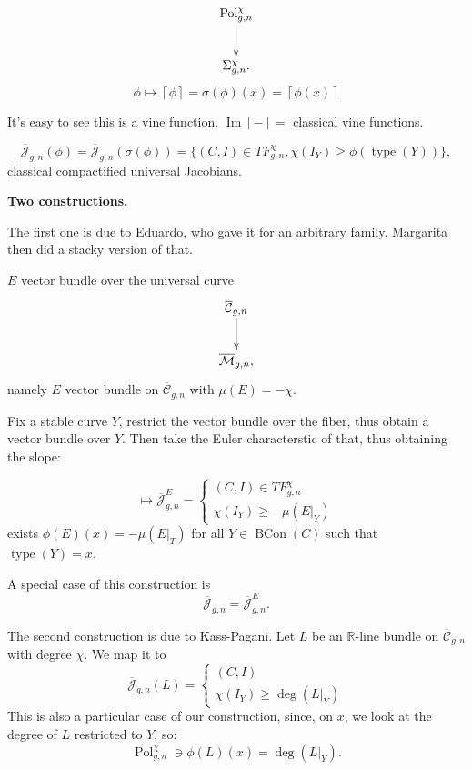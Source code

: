 $$
\xymatrix{
\operatorname{Pol}_{g,n}^{\chi}
\ar[d]\\
\Sigma_{g,n}^{\chi}.
}
$$
$$
\phi\mapsto \left\lceil \phi \right\rceil 
=
\sigma(\phi)(x)=
\left\lceil \phi(x) \right\rceil 
$$

It's easy to see this is a vine function.
$\operatorname{Im}\left\lceil - \right\rceil=$
classical vine functions.

\medskip\noindent
$$
\overline{\mathcal{J}}_{g,n}(\phi)
=
\overline{\mathcal{J}}_{g,n}(\sigma(\phi))
=\{(C,I) \in TF_{g,n}^{\chi},
\chi(I_Y) \geq 
\phi(\operatorname{type}(Y))\},
$$
classical compactified universal Jacobians.

\medskip\noindent
{\bf Two constructions.}

The first one is due to Eduardo, who gave
it for an arbitrary family. Margarita then
did a stacky version of that.

\begin{theorem}
\label{theorem-esteves-melo}
$E$ vector bundle over the universal curve
$$
\xymatrix{
\overline{\mathcal{C}}_{g,n}\ar[d]\\
\overline{\mathcal{M}}_{g,n},
}
$$
namely $E$ vector bundle on
$\overline{\mathcal{C}}_{g,n}$
with $\mu(E)=-\chi$.
\end{theorem}

\noindent
Fix a stable curve $Y$, restrict the vector bundle
over the fiber,  thus obtain a vector bundle
over $Y$. Then take the Euler characterstic
of that, thus obtaining the slope:

$$
\mapsto  \overline{ \mathcal{J}}_{g,n}^E
=
\begin{cases}
(C,I)\in TF_{g,n}^{\chi} \\
\chi(I_Y) \geq  -\mu(E|_Y)
\end{cases}
$$
exists $\phi(E)(x) = -\mu(E|_T)$
for all $Y \in \operatorname{BCon}(C)$
such that $\operatorname{type}(Y)=x$.

A special case of this construction is
$$
\overline{\mathcal{J}}_{g,n}
=
\overline{\mathcal{J}}_{g,n}^E.
$$

\medskip\noindent
The second construction is due to
Kass-Pagani. Let $L$ be an $\mathbb{R}$-line
bundle on $\overline{\mathcal{C}}_{g,n}$
with degree $\chi$.
We map it to
$$
\overline{\mathcal{J}}_{g,n}(L)
=
\begin{cases}
(C,I) \\
\chi(I_Y) \geq \operatorname{deg}(L|_Y)
\end{cases}
$$
This is also a particular case of our
construction, since, on $x$, we look at the
degree of $L$ restricted to $Y$, so:
$$
\operatorname{Pol}_{g,n}^\chi
\ni \phi(L)(x) = \operatorname{deg}(L|_Y).
$$

